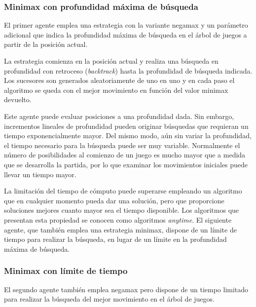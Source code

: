 \subsubsection{Minimax con profundidad máxima de búsqueda}
\label{sssec:profundidad_maxima_busqueda}
El primer agente emplea una estrategia con la variante negamax y un parámetro adicional que indica la profundidad máxima de búsqueda en el árbol de juegos a partir de la posición actual.

La estrategia comienza en la posición actual y realiza una búsqueda en profundidad con retroceso (\textit{backtrack}) hasta la profundidad de búsqueda indicada.
Los sucesores son generados aleatoriamente de uno en uno y en cada paso el algoritmo se queda con el mejor movimiento en función del valor minimax devuelto.


Este agente puede evaluar posiciones a una profundidad dada.
Sin embargo, incrementos lineales de profundidad pueden originar búsquedas que requieran un tiempo exponencialmente mayor.
Del mismo modo, aún sin variar la profundidad, el tiempo necesario para la búsqueda puede ser muy variable.
Normalmente el número de posibilidades al comienzo de un juego es mucho mayor que a medida que se desarrolla la partida, por lo que examinar los movimientos iniciales puede llevar un tiempo mayor.

La limitación del tiempo de cómputo puede superarse empleando un algoritmo que en cualquier momento pueda dar una solución, pero que proporcione soluciones mejores cuanto mayor sea el tiempo disponible.
Los algoritmos que presentan esta propiedad se conocen como algoritmos \textit{anytime}.
El siguiente agente, que también emplea una estrategia minimax, dispone de un límite de tiempo para realizar la búsqueda, en lugar de un límite en la profundidad máxima de búsqueda.

\subsubsection{Minimax con límite de tiempo}
\label{sssec:limite_tiempo}
El segundo agente también emplea negamax pero dispone de un tiempo limitado para realizar la búsqueda del mejor movimiento en el árbol de juegos.


